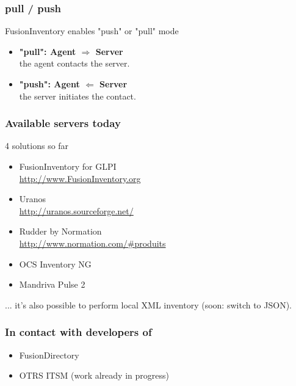 \documentclass{beamer}
\begin{document}
\begin{frame}
    \frametitle{pull / push}

    \begin{block}{FusionInventory enables "push" or "pull" mode}
    \begin{itemize}
    \item \textbf{"pull": Agent $\Longrightarrow$ Server} \\
    the agent contacts the server.
    \item \textbf{"push": Agent $\Longleftarrow$ Server} \\
    the server initiates the contact.
    \end{itemize}
    \end{block}

\end{frame}


\begin{frame}
    \frametitle{Available servers today}

    \begin{block}{4 solutions so far}
        \begin{itemize}
            \item FusionInventory for GLPI \\
            \url{http://www.FusionInventory.org}
            \item Uranos \\
            \url{http://uranos.sourceforge.net/}
            \item Rudder by Normation \\
            \url{http://www.normation.com/\#produits}
            \item OCS Inventory NG
            \item Mandriva Pulse 2

        \end{itemize}
        ... it's also possible to perform local XML inventory (soon: switch to JSON).
    \end{block}

\end{frame}

\begin{frame}
    \frametitle{In contact with developers of}

    \begin{itemize}
    \item FusionDirectory
    \item OTRS ITSM (work already in progress)
    \end{itemize}
\end{frame}
\end{document}
